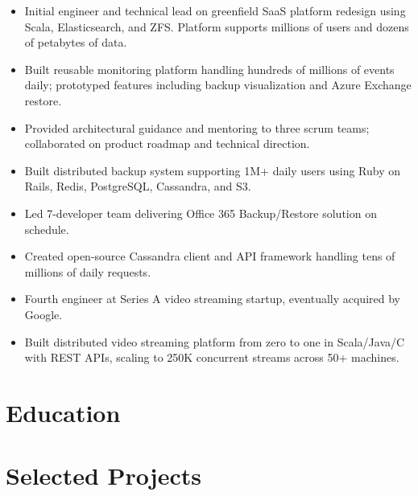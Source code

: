 \documentclass[11pt,a4paper,sans]{moderncv}
\begin{document}
{ \begin{itemize} \itemsep -2pt
  \item Initial engineer and technical lead on greenfield SaaS platform redesign using Scala, Elasticsearch, and ZFS. Platform supports millions of users and dozens of petabytes of data.
  \item Built reusable monitoring platform handling hundreds of millions of events daily; prototyped features including backup visualization and Azure Exchange restore.
  \item Provided architectural guidance and mentoring to three scrum teams; collaborated on product roadmap and technical direction.
 \end{itemize} }

{ \begin{itemize} \itemsep -2pt
  \item Built distributed backup system supporting 1M+ daily users using Ruby on Rails, Redis, PostgreSQL, Cassandra, and S3.
  \item Led 7-developer team delivering Office 365 Backup/Restore solution on schedule.
  \item Created open-source Cassandra client and API framework handling tens of millions of daily requests.
\end{itemize} }

{ \begin{itemize} \itemsep -2pt
  \item Fourth engineer at Series A video streaming startup, eventually acquired by Google.
  \item Built distributed video streaming platform from zero to one in Scala/Java/C with REST APIs, scaling to 250K concurrent streams across 50+ machines.
\end{itemize} }


\section{\textbf{Education}}

\section{\textbf{Selected Projects}}
\end{document}
